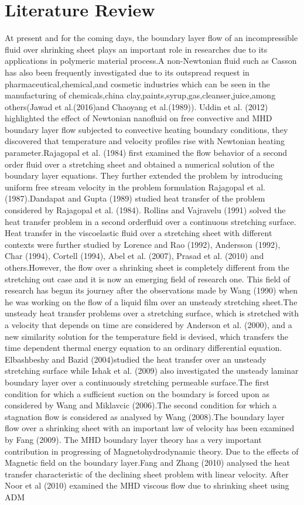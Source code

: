 \documentclass[a4paper,12pt]{report}
\begin{document}
{\section{Literature Review}
At present and for the coming days, the boundary layer flow of an incompressible fluid over shrinking sheet plays an important role in researches due to its applications in polymeric material process.A non-Newtonian fluid such as Casson has also been frequently investigated due to its outspread request in pharmaceutical,chemical,and cosmetic industries which can be seen in the manufacturing of chemicals,china clay,paints,syrup,gas,cleanser,juice,among others(Jawad et al.(2016)and Chaoyang et al.(1989)). Uddin et al. (2012) highlighted the effect of Newtonian nanofluid on free convective and MHD boundary layer flow subjected to convective heating boundary conditions, they discovered that temperature and velocity profiles rise with Newtonian heating parameter.Rajagopal et al. (1984) first examined the flow behavior of a second order fluid over a stretching sheet and obtained a numerical solution of the boundary layer equations. They further extended the problem by introducing uniform free stream velocity in the problem formulation Rajagopal et al. (1987).Dandapat and Gupta (1989) studied heat transfer of the problem considered by Rajagopal et al. (1984). Rollins and Vajravelu (1991) solved the heat transfer problem in a second orderfluid over a continuous stretching surface. Heat transfer in the viscoelastic fluid over a stretching sheet with different contexts were further studied by Lorence and Rao (1992), Andersson (1992), Char (1994), Cortell (1994), Abel et al. (2007), Prasad et al. (2010) and others.However, the flow over a shrinking sheet is completely different from the stretching out case and it is now an emerging field of research one. This field of research has begun its journey after the observations made by Wang (1990) when he was working on the flow of a liquid film over an unsteady stretching sheet.The unsteady heat transfer problems over a stretching surface, which is stretched with a velocity that depends on time are considered by Anderson et al. (2000), and a new similarity solution for the temperature field is devised, which transfers the time dependent thermal energy equation to an ordinary differential equation. Elbashbeshy and Bazid (2004)studied the heat transfer over an unsteady stretching surface while Ishak et al. (2009) also investigated the unsteady laminar boundary layer over a continuously stretching permeable surface.The first condition for which a sufficient suction on the boundary is forced upon as considered by Wang and Miklavcic (2006).The second condition for which a stagnation flow is considered as analysed by Wang (2008).The boundary layer flow over a shrinking sheet with an important law of velocity has been examined by Fang (2009). The MHD boundary layer theory has a very important contribution in progressing of Magnetohydrodynamic theory. Due to the effects of Magnetic field on the boundary layer.Fang and Zhang (2010) analysed the heat transfer characteristic of the declining sheet problem with linear velocity. After Noor et al (2010) examined the MHD viscous flow due to shrinking sheet using ADM }
\end{document}

